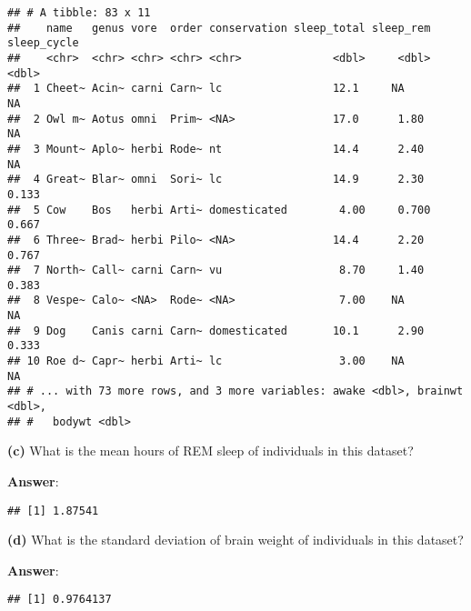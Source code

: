 \documentclass[]{article}
\newenvironment{Shaded}{\begin{snugshade}}{\end{snugshade}}
\newcommand{\KeywordTok}[1]{\textcolor[rgb]{0.13,0.29,0.53}{\textbf{#1}}}
\newcommand{\DataTypeTok}[1]{\textcolor[rgb]{0.13,0.29,0.53}{#1}}
\newcommand{\OtherTok}[1]{\textcolor[rgb]{0.56,0.35,0.01}{#1}}
\newcommand{\OperatorTok}[1]{\textcolor[rgb]{0.81,0.36,0.00}{\textbf{#1}}}
\newcommand{\NormalTok}[1]{#1}
\begin{document}
\begin{verbatim}
## # A tibble: 83 x 11
##    name   genus vore  order conservation sleep_total sleep_rem sleep_cycle
##    <chr>  <chr> <chr> <chr> <chr>              <dbl>     <dbl>       <dbl>
##  1 Cheet~ Acin~ carni Carn~ lc                 12.1     NA          NA    
##  2 Owl m~ Aotus omni  Prim~ <NA>               17.0      1.80       NA    
##  3 Mount~ Aplo~ herbi Rode~ nt                 14.4      2.40       NA    
##  4 Great~ Blar~ omni  Sori~ lc                 14.9      2.30        0.133
##  5 Cow    Bos   herbi Arti~ domesticated        4.00     0.700       0.667
##  6 Three~ Brad~ herbi Pilo~ <NA>               14.4      2.20        0.767
##  7 North~ Call~ carni Carn~ vu                  8.70     1.40        0.383
##  8 Vespe~ Calo~ <NA>  Rode~ <NA>                7.00    NA          NA    
##  9 Dog    Canis carni Carn~ domesticated       10.1      2.90        0.333
## 10 Roe d~ Capr~ herbi Arti~ lc                  3.00    NA          NA    
## # ... with 73 more rows, and 3 more variables: awake <dbl>, brainwt <dbl>,
## #   bodywt <dbl>
\end{verbatim}

\textbf{(c)} What is the mean hours of REM sleep of individuals in this
dataset?

\textbf{Answer}:

\begin{Shaded}
\end{Shaded}

\begin{verbatim}
## [1] 1.87541
\end{verbatim}

\textbf{(d)} What is the standard deviation of brain weight of
individuals in this dataset?

\textbf{Answer}:

\begin{Shaded}
\end{Shaded}

\begin{verbatim}
## [1] 0.9764137
\end{verbatim}
\end{document}
